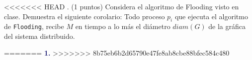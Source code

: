 <<<<<<< HEAD
. (1 puntos) Considera el algoritmo de Flooding visto en clase. Demuestra el siguiente corolario:
Todo proceso $p_i$ que ejecuta el algoritmo de {\tt Flooding}, recibe $M$ en tiempo a lo más el diámetro $diam(G)$ de la gráfica del sistema distribuido.

 

=======
\newpage
\textbf{\textcolor{MidnightBlue}{1.}}
>>>>>>> 8b75eb6b2d65790e47fe8ab8cbe88bfec584c480
